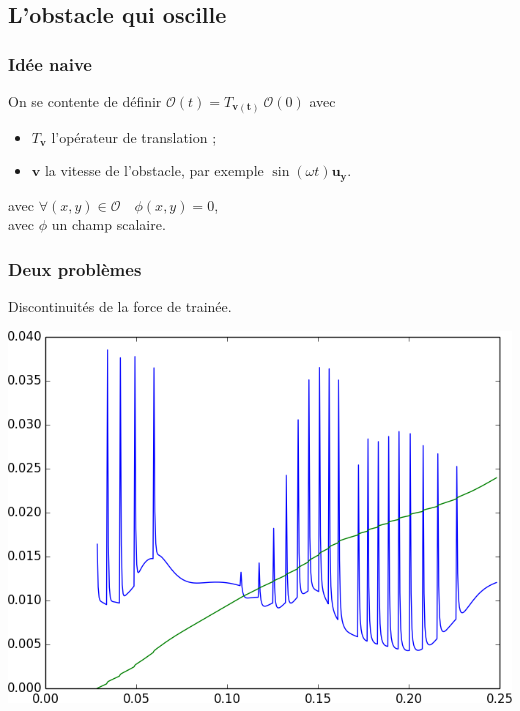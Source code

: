 \documentclass{beamer}
\renewcommand\O{\mathcal{O}}
\newcommand{\vect}[1]{\boldsymbol{#1}}
\begin{document}
  \subsection{L'obstacle qui oscille}
  \begin{frame}
    \frametitle{Idée naive}
    On se contente de définir $\O(t) = T_{\vect{v(t)}}\ \O(0)$ avec 
    \begin{itemize}
      \item $T_\vect{v}$ l'opérateur de translation ;
      \item $\vect{v}$ la vitesse de l'obstacle, par exemple $\sin(\omega
        t)\vect{u_y}$.
    \end{itemize}
    avec $\forall (x,y)\in\O\quad \phi(x,y) = 0$,\\
    avec $\phi$ un champ scalaire.
  \end{frame}
  \begin{frame}
    \frametitle{Deux problèmes}
    Discontinuités de la force de trainée.

    \centering \includegraphics[height=0.7\textheight]{penalisation.png}
  \end{frame}
\end{document}
